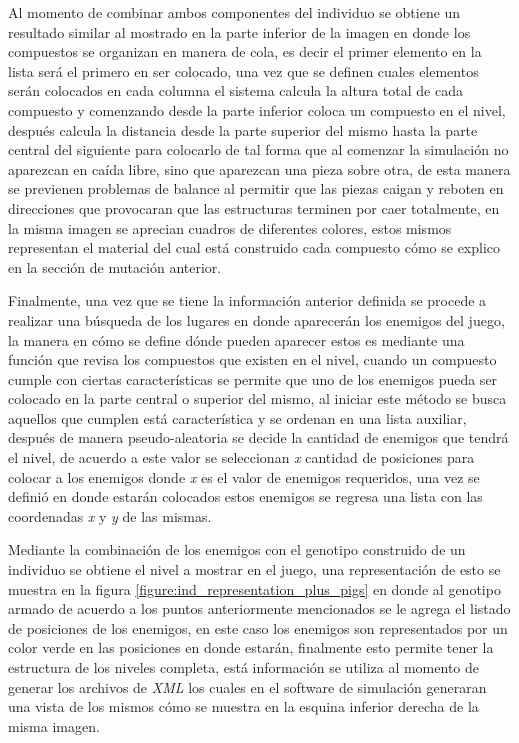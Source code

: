 Al momento de combinar ambos componentes del individuo se obtiene un resultado
similar al mostrado en la parte inferior de la imagen en donde los compuestos se
organizan en manera de cola, es decir el primer elemento en la lista será el
primero en ser colocado, una vez que se definen cuales elementos serán colocados
en cada columna el sistema calcula la altura total de cada compuesto y
comenzando desde la parte inferior coloca un compuesto en el nivel, después
calcula la distancia desde la parte superior del mismo hasta la parte central
del siguiente para colocarlo de tal forma que al comenzar la simulación no
aparezcan en caída libre, sino que aparezcan una pieza sobre otra, de esta manera
se previenen problemas de balance al permitir que las piezas caigan y
reboten en direcciones que provocaran que las estructuras terminen por caer
totalmente, en la misma imagen se aprecian cuadros de diferentes colores, estos
mismos representan el material del cual está construido cada compuesto cómo se
explico en la sección de mutación anterior.

Finalmente, una vez que se tiene la información anterior definida se procede a
realizar una búsqueda de los lugares en donde aparecerán los enemigos del juego,
la manera en cómo se define dónde pueden aparecer estos es mediante una función
que revisa los compuestos que existen en el nivel, cuando un compuesto cumple
con ciertas características se permite que uno de los enemigos pueda ser
colocado en la parte central o superior del mismo, al iniciar este método se
busca aquellos que cumplen está característica y se ordenan en una lista
auxiliar, después de manera pseudo-aleatoria se decide la cantidad de enemigos
que tendrá el nivel, de acuerdo a este valor se seleccionan \textit{x} cantidad
de posiciones para colocar a los enemigos donde \textit{x} es el valor de
enemigos requeridos, una vez se definió en donde estarán colocados estos
enemigos se regresa una lista con las coordenadas \textit{x} y \textit{y} de las
mismas.

Mediante la combinación de los enemigos con el genotipo construido de un
individuo se obtiene el nivel a mostrar en el juego, una representación de esto
se muestra en la figura \ref{figure:ind_representation_plus_pigs} en donde al
genotipo armado de acuerdo a los puntos anteriormente mencionados se le agrega el
listado de posiciones de los enemigos, en este caso los enemigos son
representados por un color verde en las posiciones en donde estarán, finalmente
esto permite tener la estructura de los niveles completa, está información se
utiliza al momento de generar los archivos de \textit{XML} los cuales en el
software de simulación generaran una vista de los mismos cómo se muestra en la
esquina inferior derecha de la misma imagen. 

